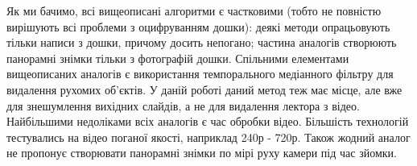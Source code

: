 \chapterConclusion

Як ми бачимо, всі вищеописані алгоритми є частковими (тобто не повністю вирішують всі проблеми
з оцифруванням дошки): деякі методи опрацьовують тільки написи з дошки, 
причому досить непогано; частина аналогів створюють панорамні знімки тільки з фотографій дошки.
Спільними елементами вищеописаних аналогів є використання 
темпорального медіанного фільтру для видалення рухомих об'єктів.
У даній роботі даний метод теж має місце, але вже для знешумлення
вихідних слайдів, а не для видалення лектора з відео.
Найбільшими недоліками всіх аналогів є час обробки відео. Більшість технологій
тестувались на відео поганої якості, наприклад 240р - 720р. 
Також жодний аналог не пропонує створювати панорамні знімки по мірі руху камери під
час зйомки.